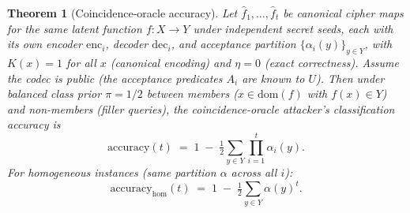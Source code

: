 \documentclass[11pt]{article}
\theoremstyle{definition}
\theoremstyle{plain}
\newtheorem{theorem}{Theorem}[section]
\theoremstyle{remark}
\newcommand{\fhat}{\hat{f}}
\newcommand{\enc}{\mathrm{enc}}
\newcommand{\dec}{\mathrm{dec}}
\begin{document}
\begin{theorem}[Coincidence-oracle accuracy]
\label{thm:coincidence-oracle}
Let $\fhat_1, \ldots, \fhat_t$ be canonical cipher maps for the same
latent function $f : X \to Y$ under independent secret seeds, each
with its own encoder $\enc_i$, decoder $\dec_i$, and acceptance
partition $\{\alpha_i(y)\}_{y \in Y}$, with $K(x) = 1$ for all $x$
(canonical encoding) and $\eta = 0$ (exact correctness).  Assume the
codec is public (the acceptance predicates $A_i$ are known to $U$).
Then under balanced class prior $\pi = 1/2$ between members
($x \in \mathrm{dom}(f)$ with $f(x) \in Y$) and non-members (filler queries),
the coincidence-oracle attacker's classification accuracy is
\begin{equation}
\mathrm{accuracy}(t)
\;=\; 1 \;-\; \tfrac{1}{2} \sum_{y \in Y} \prod_{i=1}^{t} \alpha_i(y).
\label{eq:coincidence-bound}
\end{equation}
For homogeneous instances (same partition $\alpha$ across all $i$):
\begin{equation}
\mathrm{accuracy}_{\mathrm{hom}}(t)
\;=\; 1 \;-\; \tfrac{1}{2} \sum_{y \in Y} \alpha(y)^t.
\label{eq:coincidence-homogeneous}
\end{equation}
\end{theorem}
\end{document}
